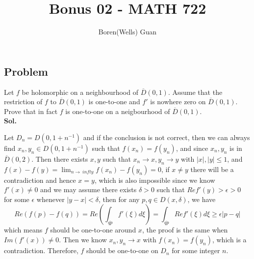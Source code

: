 \documentclass[lang=en,11pt,a4paper,citestyle =authoryear]{elegantpaper}
\title{Bonus 02 - MATH 722}
\author{Boren(Wells) Guan}
\begin{document}
\maketitle

\subsection*{Problem} 
Let $f$ be holomorphic on a neighbourhood of $\overline{D}(0,1)$. Assume that the restriction of $f$ to $\overline{D}(0,1)$ is one-to-one and $f'$ is nowhere zero on $\overline{D}(0,1)$. Prove that in fact $f$ is one-to-one on a neigbourhood of $\overline{D}(0,1)$.
\vspace{0.5em}\\
\textbf{Sol.} \par
Let $D_n = D(0,1+n^{-1})$ and if the conclusion is not correct, then we can always find $x_n,y_n\in D(0,1+n^{-1})$ such that $f(x_n) = f(y_n)$, and since $x_n,y_n$ is in $\overline{D}(0,2)$. Then there exists $x,y$ such that $x_n\to x, y_n\to y$ with $|x|,|y|\leq 1$, and $f(x) - f(y) = \lim_{n\to\ infty} f(x_n) - f(y_n) = 0$, if $x\neq y$ there will be a contradiction and hence $x = y$, which is also impossible since we know $f'(x) \neq 0$ and we may assume there exists $\delta >0$ such that $Ref'(y) > \epsilon > 0$ for some $\epsilon$ whenever $|y-x| < \delta$, then for any $p,q\in D(x,\delta)$, we have
\[
Re(f(p)-f(q))  = Re (\int_{\overline{qp}} f'(\xi)d\xi) = \int_{\overline{qp}} Ref'(\xi)d\xi \geq \epsilon|p-q|
\]
which means $f$ should be one-to-one around $x$, the proof is the same when $Im(f'(x)) \neq 0$. Then we know $x_n,y_n \to x$ with $f(x_n) = f(y_n)$, which is a contradiction. Therefore, $f$ should be one-to-one on $D_n$ for some integer $n$.
\par 
\vspace{0.5em}

\addappheadtotoc
\end{document}
